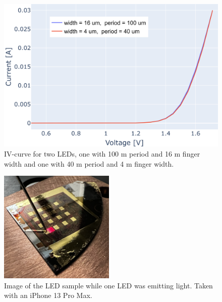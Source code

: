 \begin{figure}
    \centering
    \includegraphics[width=\linewidth]{figures/LED_IV-curve_forward.png}
    \caption{IV-curve for two LEDs, one with 100 \textmu m period and 16 \textmu m finger width and one with 40 \textmu m period and 4 \textmu m finger width.}
    \label{fig:iv_curve_forward}
\end{figure}

\begin{figure}
    \centering
    \includegraphics[width=0.49\textwidth]{figures/led_light.png}
    \caption{Image of the LED sample while one LED was emitting light. Taken with an iPhone 13 Pro Max.}
    \label{fig:led_light}
\end{figure}
